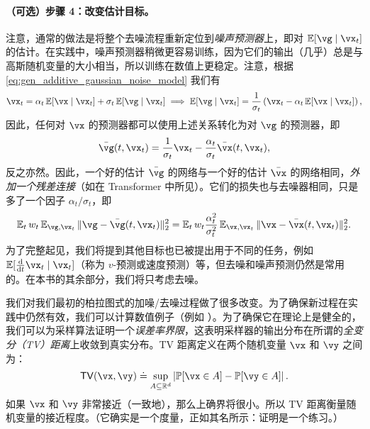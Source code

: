\documentclass[../../book-main_zh.tex]{subfiles}
\begin{document}
\paragraph{（可选）步骤 4：改变估计目标。} 注意，通常的做法是将整个去噪流程重新定位到\textit{噪声预测器}上，即对 \(\Ex[\vg \mid \vx_{t}]\) 的估计。在实践中，噪声预测器稍微更容易训练，因为它们的输出（几乎）总是与高斯随机变量的大小相当，所以训练在数值上更稳定。注意，根据 \eqref{eq:gen_additive_gaussian_noise_model} 我们有
\begin{equation}
	\vx_{t} = \alpha_{t}\Ex[\vx \mid \vx_{t}] + \sigma_{t}\Ex[\vg \mid \vx_{t}] \implies \Ex[\vg \mid \vx_{t}] = \frac{1}{\sigma_{t}}\bp{\vx_{t} - \alpha_{t}\Ex[\vx \mid \vx_{t}]},
\end{equation}
因此，任何对 \(\vx\) 的预测器都可以使用上述关系转化为对 \(\vg\) 的预测器，即
\begin{equation}
	\bar{\vg}(t, \vx_{t}) = \frac{1}{\sigma_{t}}\vx_{t} - \frac{\alpha_{t}}{\sigma_{t}}\bar{\vx}(t, \vx_{t}),
\end{equation}
反之亦然。因此，一个好的估计 \(\bar{\vg}\) 的网络与一个好的估计 \(\bar{\vx}\) 的网络相同，\textit{外加一个残差连接}（如在 Transformer 中所见）。它们的损失也与去噪器相同，只是多了一个因子 \(\alpha_{t}/\sigma_{t}\)，即
\begin{equation}
	\Ex_{t}w_{t}\Ex_{\vg, \vx_{t}}\norm{\vg - \bar{\vg}(t, \vx_{t})}_{2}^{2} = \Ex_{t}w_{t}\frac{\alpha_{t}^{2}}{\sigma_{t}^{2}}\Ex_{\vx, \vx_{t}}\norm{\vx - \bar{\vx}(t, \vx_{t})}_{2}^{2}.
\end{equation}
为了完整起见，我们将提到其他目标也已被提出用于不同的任务，例如 \(\Ex[\odv*{\vx_{t}}{t} \mid \vx_{t}]\)（称为 \(v\)-预测或速度预测）等，但去噪和噪声预测仍然是常用的。在本书的其余部分，我们将只考虑去噪。


我们对我们最初的柏拉图式的加噪/去噪过程做了很多改变。为了确保新过程在实践中仍然有效，我们可以计算数值例子（例如 ）。为了确保它在理论上是健全的，我们可以为采样算法证明一个\textit{误差率界限}，这表明采样器的输出分布在所谓的\textit{全变分（TV）距离}上收敛到真实分布。TV 距离定义在两个随机变量 \(\vx\) 和 \(\vy\) 之间为：
\begin{equation}
	\TV(\vx, \vy) \doteq \sup_{A \subseteq \R^{d}}\abs*{\Pr[\vx \in A] - \Pr[\vy \in A]}.
\end{equation}
如果 \(\vx\) 和 \(\vy\) 非常接近（一致地），那么上确界将很小。所以 TV 距离衡量随机变量的接近程度。（它确实是一个度量，正如其名所示：证明是一个练习。）
\end{document}
